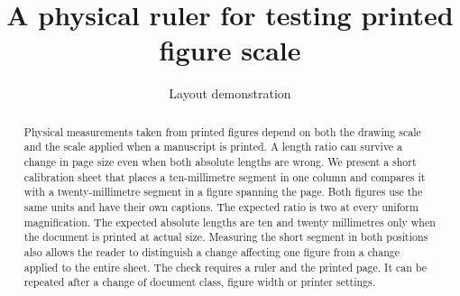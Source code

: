 \documentclass[journal]{IEEEtran}
\begin{document}
\title{A physical ruler for testing printed figure scale}
\author{Layout demonstration}
\date{}\maketitle
\begin{abstract}Physical measurements taken from printed figures depend on both the drawing scale and the scale applied when a manuscript is printed. A length ratio can survive a change in page size even when both absolute lengths are wrong. We present a short calibration sheet that places a ten-millimetre segment in one column and compares it with a twenty-millimetre segment in a figure spanning the page. Both figures use the same units and have their own captions. The expected ratio is two at every uniform magnification. The expected absolute lengths are ten and twenty millimetres only when the document is printed at actual size. Measuring the short segment in both positions also allows the reader to distinguish a change affecting one figure from a change applied to the entire sheet. The check requires a ruler and the printed page. It can be repeated after a change of document class, figure width or printer settings.\end{abstract}

\end{document}
